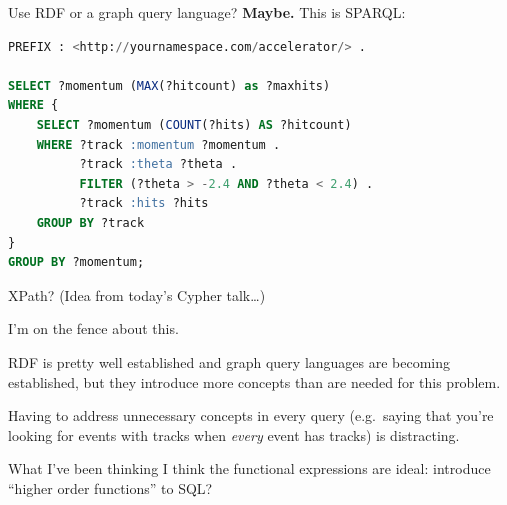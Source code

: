 \documentclass{beamer}
\begin{document}
\begin{frame}[fragile]{Use RDF or a graph query language?}
\vspace{0.25 cm}
{\bf Maybe.} This is SPARQL:

\begin{lstlisting}[language=sql]
PREFIX : <http://yournamespace.com/accelerator/> .

SELECT ?momentum (MAX(?hitcount) as ?maxhits)
WHERE {
    SELECT ?momentum (COUNT(?hits) AS ?hitcount)
    WHERE ?track :momentum ?momentum .
          ?track :theta ?theta .
          FILTER (?theta > -2.4 AND ?theta < 2.4) .
          ?track :hits ?hits
    GROUP BY ?track
}
GROUP BY ?momentum;
\end{lstlisting}

\vspace{0.25 cm}
XPath? (Idea from today's Cypher talk\ldots)

\vspace{0.25 cm}
I'm on the fence about this.

\vspace{0.25 cm}
\begin{minipage}{\linewidth}
\scriptsize
RDF is pretty well established and graph query languages are becoming established, but they introduce more concepts than are needed for this problem.

\vspace{0.25 cm}
Having to address unnecessary concepts in every query (e.g.\ saying that you're looking for events with tracks when {\it every} event has tracks) is distracting.
\end{minipage}
\end{frame}

\begin{frame}{What I've been thinking}
I think the functional expressions are ideal: introduce ``higher order functions'' to SQL?



\end{frame}
\end{document}
